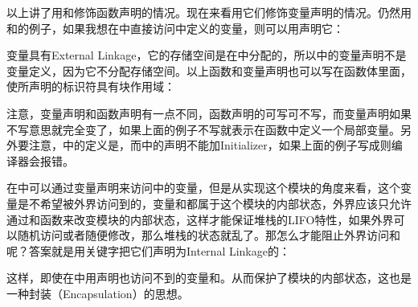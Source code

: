 以上讲了用和修饰函数声明的情况。现在来看用它们修饰变量声明的情况。仍然用和的例子，如果我想在中直接访问中定义的变量，则可以用声明它：




变量具有External Linkage，它的存储空间是在中分配的，所以中的变量声明不是变量定义，因为它不分配存储空间。以上函数和变量声明也可以写在函数体里面，使所声明的标识符具有块作用域：




注意，变量声明和函数声明有一点不同，函数声明的可写可不写，而变量声明如果不写意思就完全变了，如果上面的例子不写就表示在函数中定义一个局部变量。另外要注意，中的定义是，而中的声明不能加Initializer，如果上面的例子写成则编译器会报错。



在中可以通过变量声明来访问中的变量，但是从实现这个模块的角度来看，这个变量是不希望被外界访问到的，变量和都属于这个模块的内部状态，外界应该只允许通过和函数来改变模块的内部状态，这样才能保证堆栈的LIFO特性，如果外界可以随机访问或者随便修改，那么堆栈的状态就乱了。那怎么才能阻止外界访问和呢？答案就是用关键字把它们声明为Internal Linkage的：




这样，即使在中用声明也访问不到的变量和。从而保护了模块的内部状态，这也是一种封装（Encapsulation）的思想。



